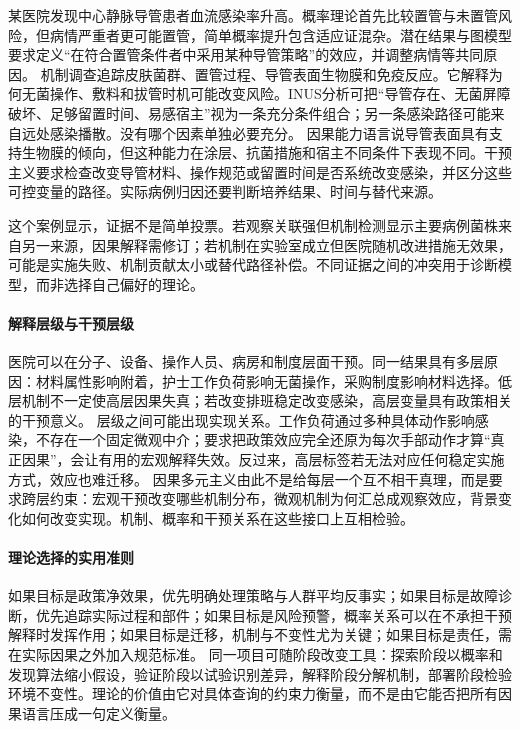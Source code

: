 某医院发现中心静脉导管患者血流感染率升高。概率理论首先比较置管与未置管风险，但病情严重者更可能置管，简单概率提升包含适应证混杂。潜在结果与图模型要求定义“在符合置管条件者中采用某种导管策略”的效应，并调整病情等共同原因。
机制调查追踪皮肤菌群、置管过程、导管表面生物膜和免疫反应。它解释为何无菌操作、敷料和拔管时机可能改变风险。INUS分析可把“导管存在、无菌屏障破坏、足够留置时间、易感宿主”视为一条充分条件组合；另一条感染路径可能来自远处感染播散。没有哪个因素单独必要充分。
因果能力语言说导管表面具有支持生物膜的倾向，但这种能力在涂层、抗菌措施和宿主不同条件下表现不同。干预主义要求检查改变导管材料、操作规范或留置时间是否系统改变感染，并区分这些可控变量的路径。实际病例归因还要判断培养结果、时间与替代来源。

这个案例显示，证据不是简单投票。若观察关联强但机制检测显示主要病例菌株来自另一来源，因果解释需修订；若机制在实验室成立但医院随机改进措施无效果，可能是实施失败、机制贡献太小或替代路径补偿。不同证据之间的冲突用于诊断模型，而非选择自己偏好的理论。

\paragraph{解释层级与干预层级}

医院可以在分子、设备、操作人员、病房和制度层面干预。同一结果具有多层原因：材料属性影响附着，护士工作负荷影响无菌操作，采购制度影响材料选择。低层机制不一定使高层因果失真；若改变排班稳定改变感染，高层变量具有政策相关的干预意义。
层级之间可能出现实现关系。工作负荷通过多种具体动作影响感染，不存在一个固定微观中介；要求把政策效应完全还原为每次手部动作才算“真正因果”，会让有用的宏观解释失效。反过来，高层标签若无法对应任何稳定实施方式，效应也难迁移。
因果多元主义由此不是给每层一个互不相干真理，而是要求跨层约束：宏观干预改变哪些机制分布，微观机制为何汇总成观察效应，背景变化如何改变实现。机制、概率和干预关系在这些接口上互相检验。

\paragraph{理论选择的实用准则}

如果目标是政策净效果，优先明确处理策略与人群平均反事实；如果目标是故障诊断，优先追踪实际过程和部件；如果目标是风险预警，概率关系可以在不承担干预解释时发挥作用；如果目标是迁移，机制与不变性尤为关键；如果目标是责任，需在实际因果之外加入规范标准。
同一项目可随阶段改变工具：探索阶段以概率和发现算法缩小假设，验证阶段以试验识别差异，解释阶段分解机制，部署阶段检验环境不变性。理论的价值由它对具体查询的约束力衡量，而不是由它能否把所有因果语言压成一句定义衡量。


